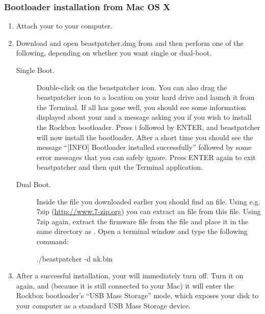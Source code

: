 \subsubsection{Bootloader installation from Mac OS X}
\begin{enumerate}
\item Attach your \dap{} to your computer.

\item Download and open beastpatcher.dmg from 
and then perform one of the following,
depending on whether you want single or dual-boot.

\begin{description}
\item [Single Boot.] Double-click on the beastpatcher icon. You can also
drag the beastpatcher icon to a location on your hard drive and launch
it from the Terminal. If all has gone well, you should see some 
information displayed about your \dap{} and a message asking you if you 
wish to install the Rockbox bootloader. Press i followed by ENTER, and 
beastpatcher will now install the bootloader. After a short time you 
should see the message ``[INFO] Bootloader installed successfully''
followed by some error messages that you can safely ignore. Press 
ENTER again to exit beastpatcher and then quit the Terminal application.

\item [Dual Boot.] Inside the  file you downloaded earlier
you should find an  file.  Using e.g. 7zip
(\url{http://www.7-zip.org}) you can extract an  file from this
 file.  Using 7zip again, extract the \playerman{} firmware file
 from the  file and place it in the same
directory as .  Open a terminal window and type the
following command:

\begin{code} 
    ./beastpatcher -d nk.bin
\end{code}
\end{description}

\item After a successful installation, your \dap{} will immediately turn off.
Turn it on again, and (because it is still connected to your Mac)
it will enter the Rockbox bootloader's
``USB Mass Storage'' mode, which exposes your \daps{} disk to your computer
as a standard USB Mass Storage device.
\end{enumerate}

